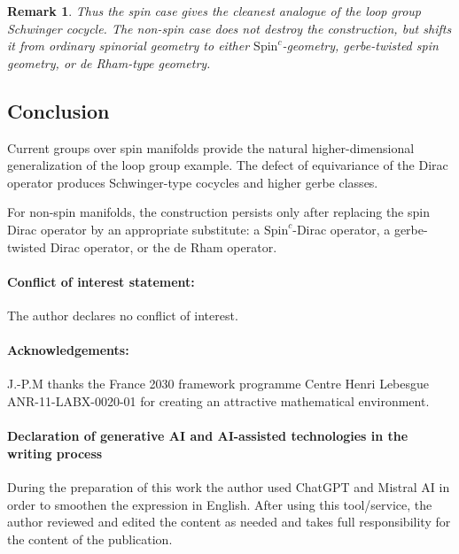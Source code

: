 \documentclass[11pt]{amsart}
\newtheorem{remark}[definition]{Remark}
\begin{document}
\begin{remark}
Thus the spin case gives the cleanest analogue of the loop group Schwinger cocycle. The non-spin case does not destroy the construction, but shifts it from ordinary spinorial geometry to either \(\mathrm{Spin}^c\)-geometry, gerbe-twisted spin geometry, or de Rham-type geometry.
\end{remark}

\subsection{Conclusion}

Current groups over spin manifolds provide the natural higher-dimensional generalization of the loop group example. The defect of equivariance of the Dirac operator produces Schwinger-type cocycles and higher gerbe classes.

For non-spin manifolds, the construction persists only after replacing the spin Dirac operator by an appropriate substitute: a \(\mathrm{Spin}^c\)-Dirac operator, a gerbe-twisted Dirac operator, or the de Rham operator.

\vskip 12pt

\paragraph{Conflict of interest statement:} The author declares no conflict of interest.

\vskip 12pt

\paragraph{\bf Acknowledgements:} J.-P.M  thanks the France 2030 framework programme Centre Henri Lebesgue ANR-11-LABX-0020-01 
for creating an attractive mathematical environment.

\vskip 12pt

\paragraph{\bf Declaration of generative AI and AI-assisted technologies in the writing process}

During the preparation of this work the author used ChatGPT and Mistral AI in order to smoothen the expression in English. After using this tool/service, the author reviewed and edited the content as needed and takes full responsibility for the content of the publication.
\end{document}
